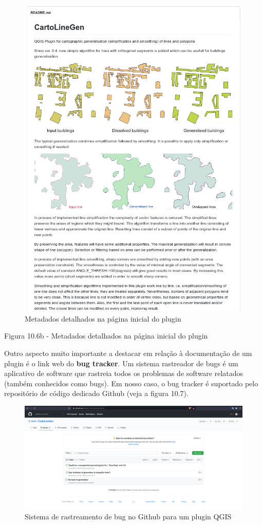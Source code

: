 \documentclass[
]{krantz}
\begin{document}
\begin{figure}
\centering
\includegraphics{media/modulo10/fig106_b.png}
\caption{Metadados detalhados na página inicial do plugin}
\end{figure}

Figura 10.6b - Metadados detalhados na página inicial do plugin

Outro aspecto muito importante a destacar em relação à documentação de um plugin é o link web do \textbf{bug tracker}. Um sistema rastreador de bugs é um aplicativo de software que rastreia todos os problemas de software relatados (também conhecidos como bugs). Em nosso caso, o bug tracker é suportado pelo repositório de código dedicado Github (veja a figura 10.7).

\begin{figure}
\centering
\includegraphics{media/modulo10/fig107.png}
\caption{Sistema de rastreamento de bug no Github para um plugin QGIS}
\end{figure}
\end{document}

